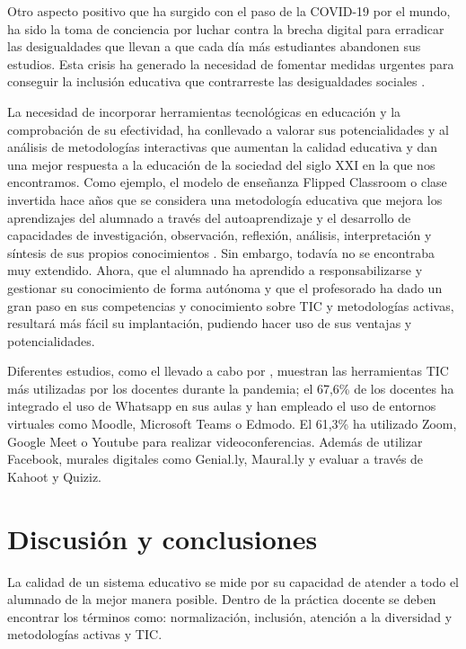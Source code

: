 \documentclass[spanish]{textolivre}
\begin{document}
Otro aspecto positivo que ha surgido con el paso de la COVID-19 por el mundo, ha sido la toma de conciencia por luchar contra la brecha digital para erradicar las desigualdades que llevan a que cada día más estudiantes abandonen sus estudios. Esta crisis ha generado la necesidad de fomentar medidas urgentes para conseguir la inclusión educativa que contrarreste las desigualdades sociales \cite{rojaslondono2020}.

La necesidad de incorporar herramientas tecnológicas en educación y la comprobación de su efectividad, ha conllevado a valorar sus potencialidades y al análisis de metodologías interactivas que aumentan la calidad educativa y dan una mejor respuesta a la educación de la sociedad del siglo XXI en la que nos encontramos. Como ejemplo, el modelo de enseñanza Flipped Classroom o clase invertida hace años que se considera una metodología educativa que mejora los aprendizajes del alumnado a través del autoaprendizaje y el desarrollo de capacidades de investigación, observación, reflexión, análisis, interpretación y síntesis de sus propios conocimientos \cite{rodriguez+hidalgo2018, carreno2019}. Sin embargo, todavía no se encontraba muy extendido. Ahora, que el alumnado ha aprendido a responsabilizarse y gestionar su conocimiento de forma autónoma y que el profesorado ha dado un gran paso en sus competencias y conocimiento sobre TIC y metodologías activas, resultará más fácil su implantación, pudiendo hacer uso de sus ventajas y potencialidades. 

Diferentes estudios, como el llevado a cabo por \textcite{ardini2020}, muestran las herramientas TIC más utilizadas por los docentes durante la pandemia; el 67,6\% de los docentes ha integrado el uso de Whatsapp en sus aulas y han empleado el uso de entornos virtuales como Moodle, Microsoft Teams o Edmodo. El 61,3\% ha utilizado Zoom, Google Meet o Youtube para realizar videoconferencias. Además de utilizar Facebook, murales digitales como Genial.ly, Maural.ly y evaluar a través de Kahoot y Quiziz.

\section{Discusión y conclusiones}
La calidad de un sistema educativo se mide por su capacidad de atender a todo el alumnado de la mejor manera posible. Dentro de la práctica docente se deben encontrar los términos como: normalización, inclusión, atención a la diversidad y metodologías activas y TIC.
\end{document}
